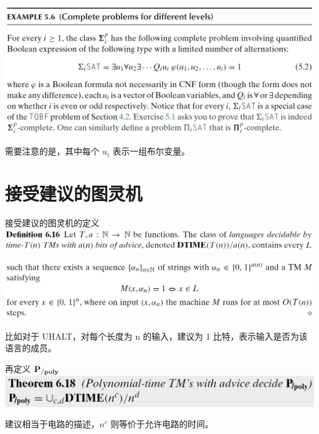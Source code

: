 \documentclass[UTF8,aspectratio=169,mathserif]{beamer}
\begin{document}
	\begin{frame}
		\includegraphics[width=\linewidth]{../../5 & 6/note.assets/image-20210427093527360.png}\newline
		
		需要注意的是，其中每个 $u_i$ 表示一组布尔变量。
	\end{frame}
	
	\section{接受建议的图灵机}
	\begin{frame}{接受建议的图灵机的定义}
		\includegraphics[width=\linewidth]{../../5 & 6/note.assets/image-20210427152508556.png}
	
		\includegraphics[width=\linewidth]{../../5 & 6/note.assets/image-20210427152516223.png}\newline
		
		比如对于 UHALT，对每个长度为 n 的输入，建议为 1 比特，表示输入是否为该语言的成员。
	\end{frame}

	\begin{frame}{再定义 $\bf P_{/poly}$}
		\includegraphics[width=\linewidth]{../../5 & 6/note.assets/image-20210427152742956.png}\newline
		
		建议相当于电路的描述，$n^c$ 则等价于允许电路的时间。
	\end{frame}
	
\end{document}
